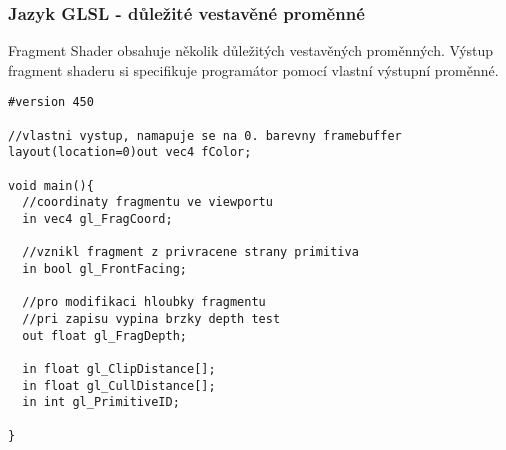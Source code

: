 \begin{frame}[fragile]
\frametitle{Jazyk GLSL - důležité vestavěné proměnné}
Fragment Shader obsahuje několik důležitých vestavěných proměnných.
Výstup fragment shaderu si specifikuje programátor pomocí vlastní výstupní proměnné.
{\scriptsize
\begin{verbatim}
#version 450

//vlastni vystup, namapuje se na 0. barevny framebuffer
layout(location=0)out vec4 fColor;

void main(){
  //coordinaty fragmentu ve viewportu
  in vec4 gl_FragCoord;

  //vznikl fragment z privracene strany primitiva
  in bool gl_FrontFacing;

  //pro modifikaci hloubky fragmentu
  //pri zapisu vypina brzky depth test
  out float gl_FragDepth;

  in float gl_ClipDistance[];
  in float gl_CullDistance[];
  in int gl_PrimitiveID;

}

\end{verbatim}
}
\end{frame}

